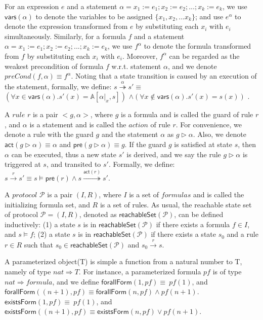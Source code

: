 \documentclass[final]{IEEEtran}
\def \andc {\wedge }
\def \orc {\vee }
\begin{document}
{For an expression $e$ and a statement $\alpha= x_1:=e_1;x_2:=e_2;...;x_k:=e_k $, we use $\mathsf{vars(\alpha)}$ to denote the variables to be assigned $\{x_1,x_2,...x_k\}$; and use $e^{\alpha}$ to denote the expression transformed from $e$ by substituting each $x_i$ with $e_i$ simultaneously.
Similarly, for a formula $f$  and a statement $\alpha= x_1:=e_1;x_2:=e_2;...;x_k:=e_k $, we use $f^{\alpha}$ to denote the formula transformed from $f$ by substituting each $x_i$ with $e_i$.
Moreover, $f^{\alpha}$ can be regarded as the weakest precondition of formula $f$ w.r.t. statement $\alpha$, and we denote $preCond(f,\alpha)\equiv f^{\alpha}$. Noting that a state transition is caused by an execution of the statement, formally, we define: $s\overset{\alpha}{\twoheadrightarrow } s' \equiv$ $(\forall x \in \mathsf{vars}(\alpha). s'(x)= \mathbb{A}[\alpha|_x,s])$ $\wedge (\forall x \notin \mathsf{vars}(\alpha). s'(x)= s(x))$ .

A $rule$ $r$ is a pair $<g,\alpha>$, where $g$ is a formula and is called the guard of rule $r$, and $\alpha$ is a statement and is called the $action$ of rule $r$.
 For convenience, we denote a rule with the guard $g$ and the statement $\alpha$ as $g \vartriangleright \alpha$. Also, we denote $\mathsf{act}(g \vartriangleright \alpha)\equiv \alpha$ and $\mathsf{pre}(g \vartriangleright \alpha)\equiv g$. If the guard $g$ is satisfied at state $s$, then $\alpha$ can be executed, thus a new state $s'$ is derived, and we say the rule $g \vartriangleright \alpha$ is triggered at $s$, and transited to $s'$. Formally, we define: $s\overset{r}{\rightarrow } s' \equiv s\models \mathsf{pre}(r) \wedge s\overset{\mathsf{act}(r)}{\twoheadrightarrow } s'$.

A $protocol$ $\mathcal{P}$ is a pair $(I,R)$, where $I$ is a set of $formulas$ and is called the initializing formula  set, and $R$ is a set of rules. %
 As usual, the reachable state set of protocol  $\mathcal{P}=(I,R)$, denoted as $\mathsf{reachableSet}(\mathcal{P})$, can be defined inductively: (1) a state $s$ is in
$\mathsf{reachableSet}(\mathcal{P})$ if there exists a formula $f \in I$, and $s \models  f$; (2) a state $s$ is in
$\mathsf{reachableSet}(\mathcal{P})$ if there exists a  state $s_0$  and a rule $r \in R$ such that $s_0 \in \mathsf{reachableSet}(\mathcal{P})$ and $s_0\overset{r}{\rightarrow } s$.

A parameterized object(T) is simple a function from a natural number to T, namely of type $nat \Rightarrow T$. For instance, a parameterized formula $pf$ is of type $nat \Rightarrow formula$, and we define
$\mathsf{forallForm}(1,pf)\equiv~pf(1)$, and $\mathsf{forallForm}((n+1),pf)\equiv\mathsf{forallForm}(n,pf) \andc pf(n +1)$. $\mathsf{existsForm}(1,pf)\equiv~pf(1)$, and $\mathsf{existsForm}((n+1),pf)\equiv\mathsf{existsForm}(n,pf) \orc pf(n +1)$.

}
\end{document}
